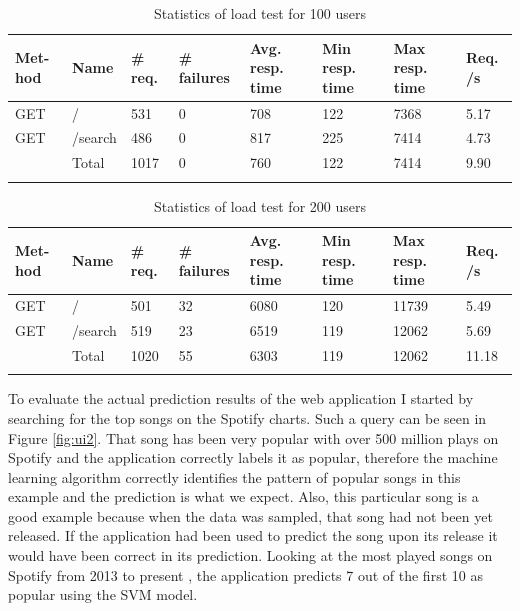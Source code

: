 \begin{longtable}{|p{1cm}|p{2cm}|p{1.5cm}|p{1cm}|p{1cm}|p{1cm}|p{1cm}|p{1cm}|}
\hline
\textbf{Met-hod} & \textbf{Name}              & \textbf{\# req.} & \textbf{\# failures} & \textbf{Avg. resp. time} & \textbf{Min resp. time} & \textbf{Max resp. time} & \textbf{Req. /s} \\ \hline
GET             & /                          & 531                  & 0                    & 708                            & 122                        & 7368                       & 5.17                \\ \hline
GET             & /search  & 486                  & 0                    & 817                            & 225                        & 7414                       & 4.73                \\ \hline
                & Total                      & 1017                 & 0                    & 760                            & 122                        & 7414                       & 9.90                \\ \hline
\caption{Statistics of load test for 100 users}
\label{tab:loadtest1}
\end{longtable}

\begin{longtable}{|p{1cm}|p{2cm}|p{1.5cm}|p{1cm}|p{1cm}|p{1cm}|p{1cm}|p{1cm}|}
\hline
\textbf{Met-hod} & \textbf{Name} & \textbf{\# req.} & \textbf{\# failures} & \textbf{Avg. resp. time} & \textbf{Min resp. time} & \textbf{Max resp. time} & \textbf{Req. /s} \\ \hline
GET             & /             & 501                  & 32                   & 6080                     & 120                     & 11739                   & 5.49             \\ \hline
GET             & /search       & 519                  & 23                   & 6519                     & 119                     & 12062                   & 5.69             \\ \hline
                & Total         & 1020                 & 55                   & 6303                     & 119                     & 12062                   & 11.18            \\ \hline
\caption{Statistics of load test for 200 users}
\label{tab:loadtest2}
\end{longtable}

To evaluate the actual prediction results of the web application I started by searching for the top songs on the Spotify charts. Such a query can be seen in Figure \ref{fig:ui2}. That song has been very popular with over 500 million plays on Spotify and the application correctly labels it as popular, therefore the machine learning algorithm correctly identifies the pattern of popular songs in this example and the prediction is what we expect. Also, this particular song is a good example because when the data was sampled, that song had not been yet released. If the application had been used to predict the song upon its release it would have been correct in its prediction. Looking at the most played songs on Spotify from 2013 to present \cite{SpotifyCharts:online}, the application predicts 7 out of the first 10 as popular using the SVM model. 

